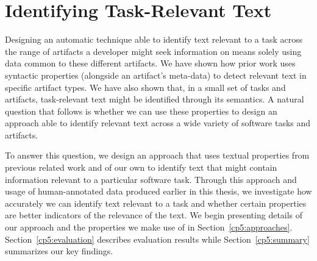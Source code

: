 \setcounter{chapter}{4}
\setcounter{rq}{1}


\chapter{Identifying Task-Relevant Text}
\label{ch:identifying}



Designing an automatic technique able to identify text relevant to a task across the range of artifacts a developer might seek information on means solely using data common to these different artifacts.
We have shown how  prior work uses syntactic properties (alongside an artifact's meta-data)
to detect relevant text in specific artifact types.
We have also shown that, in a small set of tasks and artifacts, task-relevant text might be identified through its semantics.
A natural question that follows is whether we can use these properties to design an approach able to identify relevant text across a wide variety of software tasks and artifacts.




To answer this question, we design an approach that uses textual properties from previous related work and of our own to identify text that might contain information relevant to a particular software task.
Through this approach and usage of human-annotated data produced earlier in this thesis, we 
investigate how accurately we can identify text relevant to a task and whether certain properties are better indicators of the relevance of the text.
We begin presenting details of our approach and the properties we make use of in Section~\ref{cp5:approaches}.
Section~\ref{cp5:evaluation} describes evaluation results while
Section~\ref{cp5:summary} summarizes our key findings.







